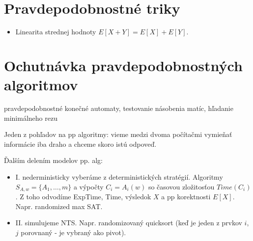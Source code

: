 \documentclass[12pt,a4paper]{article}
\begin{document}
\section{Pravdepodobnostné triky}
\begin{itemize} 
  \item Linearita strednej hodnoty $E[X + Y] = E[X] + E[Y]$. 
\end{itemize} 

\section{Ochutnávka pravdepodobnostných algoritmov}
pravdepodobnostné konečné automaty, testovanie násobenia matíc, hľadanie minimálneho rezu
   
Jeden z pohľadov na pp algoritmy: vieme medzi dvoma počítačmi vymieňať informácie iba draho a chceme skoro istú odpoveď. 
   
Ďalším delením modelov pp. alg: 
  \begin{itemize} 
    \item I. nederministicky vyberáme z deterministických stratégií. Algoritmy $S_{A,w} = \{A_1, \ldots, m\}$ a výpočty $C_i = A_i(w)$ so časovou zložitosťou $Time(C_i)$. Z toho odvodíme ExpTime, Time, výsledok $X$ a pp korektnosti $E[X]$. Napr. randomized max SAT. 
    \item II. simulujeme NTS. Napr. randomizovaný quicksort (keď je jeden z prvkov $i$,$j$ porovnaný - je vybraný ako pivot). 
  \end{itemize} 
\end{document}
